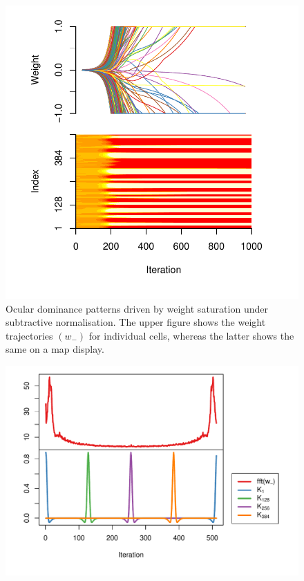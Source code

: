 \documentclass[10pt]{article}\usepackage[]{graphicx}\usepackage[]{color}
\makeatletter
\def\maxwidth{ %
  \ifdim\Gin@nat@width>\linewidth
    \linewidth
  \else
    \Gin@nat@width
  \fi
}
\theoremstyle{plain}
\makeatother
\begin{document}
\begin{multicols*}{2}
\begin{Schunk}
\begin{figure}[H]
{\centering \includegraphics[width=\maxwidth]{../figures/twocolumn-4_ocular_dom-1} 

}

\caption[Ocular dominance patterns driven by weight saturation under subtractive normalisation]{Ocular dominance patterns driven by weight saturation under subtractive normalisation. The upper figure shows the weight trajectories $(w_-)$ for individual cells, whereas the latter shows the same on a map display.}\label{fig:4_ocular_dom}
\end{figure}
\end{Schunk}


\begin{Schunk}
\begin{figure}[H]

{\centering \includegraphics[width=\maxwidth]{../figures/twocolumn-4_Fourier_k-1} 

}
\end{figure}
\end{Schunk}
\end{multicols*}
\end{document}
